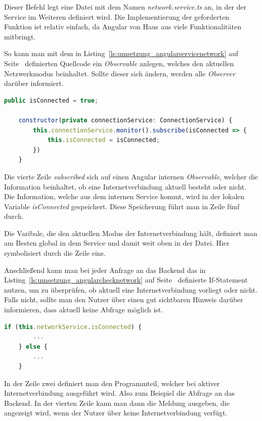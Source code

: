 Dieser Befehl legt eine Datei mit dem Namen \textit{network.service.ts} an, in der der Service im Weiteren definiert
wird. Die Implementierung der geforderten Funktion ist relativ einfach, da Angular von Haus aus viele Funktionalitäten
mitbringt.

So kann man mit dem in Listing~\ref{ls:umsetzung_angularservicenetwork} auf
Seite~\pageref{ls:umsetzung_angularservicenetwork} definierten Quellcode ein \textit{Observable} anlegen, welches den
aktuellen Netzwerkmodus beinhaltet. Sollte dieser sich ändern, werden alle \textit{Observer} darüber informiert.

\begin{lstlisting}[language=JavaScript, caption=Funktion des Network-Services, label=ls:umsetzung_angularservicenetwork]
    public isConnected = true;

    constructor(private connectionService: ConnectionService) {
        this.connectionService.monitor().subscribe(isConnected => {
            this.isConnected = isConnected;
        })
    }
\end{lstlisting}

Die vierte Zeile \textit{subscribed} sich auf einen Angular internen \textit{Observable}, welcher die Information
beinhaltet, ob eine Internetverbindung aktuell besteht oder nicht. Die Information, welche aus dem internen Service
kommt, wird in der lokalen Variable \textit{isConnected} gespeichert. Diese Speicherung führt man in Zeile fünf durch.

Die Varibale, die den aktuellen Modus der Internetverbindung hält, definiert man am Besten global in dem Service und
damit weit oben in der Datei. Hier symbolisiert durch die Zeile eins.

Anschließend kann man bei jeder Anfrage an das Backend das in Listing~\ref{ls:umsetzung_angularchecknetwork} auf
Seite~\pageref{ls:umsetzung_angularchecknetwork} definierte If-Statement nutzen, um zu überprüfen, ob aktuell eine
Internetverbindung vorliegt oder nicht. Falls nicht, sollte man den Nutzer über einen gut sichtbaren Hinweis darüber
informieren, dass aktuell keine Abfrage möglich ist.

\begin{lstlisting}[language=JavaScript, caption=Überprüfung ob eine Internetverbindung vorliegt, label=ls:umsetzung_angularchecknetwork]
    if (this.networkService.isConnected) {
        ...
    } else {
        ...
    }
\end{lstlisting}

In der Zeile zwei definiert man den Programmteil, welcher bei aktiver Internetverbindung ausgeführt wird. Also zum
Beispiel die Abfrage an das Backend. In der vierten Zeile kann man dann die Meldung ausgeben, die angezeigt wird, wenn
der Nutzer über keine Internetverbindung verfügt.

